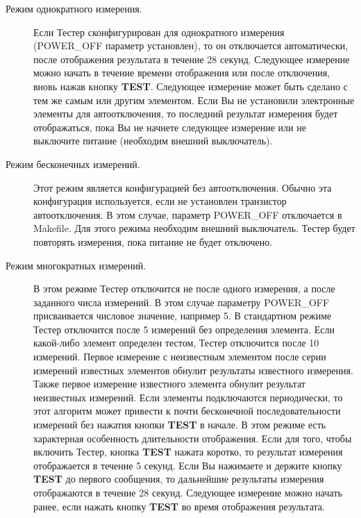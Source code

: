 \begin{description}
  \item[Режим однократного измерения.] Если Тестер сконфигурирован для однократного измерения (POWER\_OFF 
параметр установлен), то он отключается автоматически, после отображения результата в течение 28 секунд. Следующее 
измерение можно начать в течение времени отображения или после отключения, вновь нажав кнопку \textbf{ TEST}. 
Следующее измерение может быть сделано с тем же самым или другим элементом. Если Вы не установили электронные 
элементы для автоотключения, то последний результат измерения будет отображаться, пока Вы не начнете следующее 
измерение или не выключите питание (необходим внешний выключатель).

  \item[Режим бесконечных измерений.] Этот режим является конфигурацией без автоотключения.
Обычно эта конфигурация используется, если не установлен транзистор автоотключения. В этом случае, параметр POWER\_OFF 
отключается в Makefile. 
Для этого режима необходим внешний выключатель. Тестер будет повторять измерения, пока питание не будет отключено.

  \item[Режим многократных измерений.] В этом режиме Тестер отключится не после одного измерения, а после заданного 
числа измерений.
В этом случае параметру POWER\_OFF присваивается числовое значение, например 5.
В стандартном режиме Тестер отключится после 5 измерений без определения элемента. Если какой-либо 
элемент определен тестом, Тестер отключится после 10 измерений. Первое измерение с неизвестным элементом после серии 
измерений известных элементов обнулит результаты известного измерения. Также первое измерение известного элемента 
обнулит результат неизвестных измерений. Если элементы подключаются периодически, то этот алгоритм может привести к 
почти бесконечной последовательности измерений без нажатия кнопки \textbf{ TEST} в начале. В этом режиме есть характерная 
особенность длительности отображения. Если для того, чтобы включить Тестер, кнопка \textbf{ TEST} нажата коротко, 
то результат измерения отображается в течение 5 секунд. Если Вы нажимаете и держите кнопку \textbf{ TEST} до первого 
сообщения, то дальнейшие результаты измерения отображаются в течение 28 секунд. Следующее измерение можно начать 
ранее, если нажать кнопку \textbf{ TEST} во время отображения результата.

\end{description}

